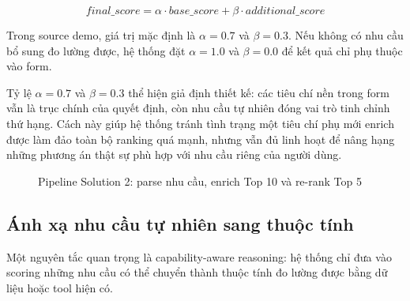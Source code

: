\documentclass[a4paper,12pt]{article}
\begin{document}
\[
final\_score = \alpha \cdot base\_score + \beta \cdot additional\_score
\]

Trong source demo, giá trị mặc định là $\alpha = 0.7$ và $\beta = 0.3$. Nếu không có nhu cầu bổ sung đo lường được, hệ thống đặt $\alpha = 1.0$ và $\beta = 0.0$ để kết quả chỉ phụ thuộc vào form.

Tỷ lệ $\alpha = 0.7$ và $\beta = 0.3$ thể hiện giả định thiết kế: các tiêu chí nền trong form vẫn là trục chính của quyết định, còn nhu cầu tự nhiên đóng vai trò tinh chỉnh thứ hạng. Cách này giúp hệ thống tránh tình trạng một tiêu chí phụ mới enrich được làm đảo toàn bộ ranking quá mạnh, nhưng vẫn đủ linh hoạt để nâng hạng những phương án thật sự phù hợp với nhu cầu riêng của người dùng.

\begin{figure}[H]
\centering
{}
\caption{Pipeline Solution 2: parse nhu cầu, enrich Top 10 và re-rank Top 5}
\label{fig:solution2_pipeline}
\end{figure}

\subsection{Ánh xạ nhu cầu tự nhiên sang thuộc tính}
Một nguyên tắc quan trọng là capability-aware reasoning: hệ thống chỉ đưa vào scoring những nhu cầu có thể chuyển thành thuộc tính đo lường được bằng dữ liệu hoặc tool hiện có.
\end{document}
